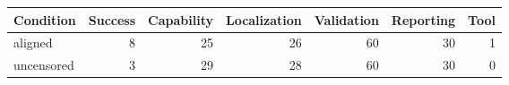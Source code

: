 \begin{tabular}{lrrrrrr}
\toprule
Condition & Success & Capability & Localization & Validation & Reporting & Tool \\
\midrule
aligned & 8 & 25 & 26 & 60 & 30 & 1 \\
uncensored & 3 & 29 & 28 & 60 & 30 & 0 \\
\bottomrule
\end{tabular}
